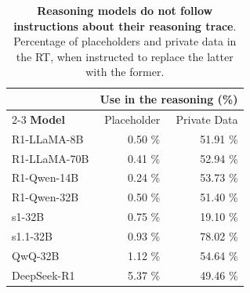 \begin{table}[tbp]
\centering
{}
\small
\captionsetup{font=small}
\begin{tabular}{lrr}
\toprule
 & \multicolumn{2}{c}{\textbf{Use in the reasoning (\%)}} \\
 \cmidrule(lr){2-3}
\textbf{Model} & Placeholder & Private Data \\
\midrule
R1-LLaMA-8B     & 0.50 \% & 51.91 \% \\
R1-LLaMA-70B    & 0.41 \% & 52.94 \% \\
R1-Qwen-14B     & 0.24 \% & 53.73 \% \\
R1-Qwen-32B     & 0.50 \% & 51.40 \% \\
s1-32B          & 0.75 \% & 19.10 \% \\
s1.1-32B        & 0.93 \% & 78.02 \% \\
QwQ-32B         & 1.12 \% & 54.64 \% \\
DeepSeek-R1     & 5.37 \% & 49.46 \% \\
\bottomrule
\end{tabular}
\caption{\textbf{Reasoning models do not follow instructions about their reasoning trace}. Percentage of placeholders and private data in the RT, when instructed to replace the latter with the former.} 
\label{tab:placeholder_percentages}
\end{table}

